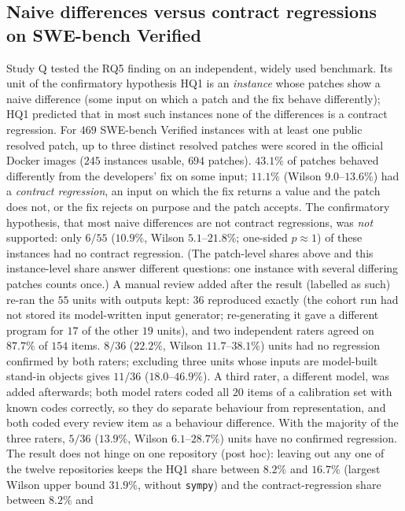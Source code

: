 \subsection{Naive differences versus contract regressions on SWE-bench Verified}
\label{sec:eval-swebench}
Study Q tested the RQ5 finding on an independent, widely used benchmark.  Its unit of the confirmatory hypothesis HQ1 is an
\emph{instance} whose patches show a naive difference (some input on which a patch and the fix behave differently); HQ1 predicted
that in most such instances none of the differences is a contract regression.  For $469$ SWE-bench Verified instances with at least one
public resolved patch, up to three distinct resolved patches were scored in the official Docker images ($245$ instances usable,
$694$ patches).  $43.1\%$ of patches behaved differently from the developers' fix on some input; $11.1\%$ (Wilson $9.0$--$13.6\%$)
had a \emph{contract regression}, an input on which the fix returns a value and the patch does not, or the fix rejects on purpose
and the patch accepts.  The confirmatory hypothesis, that most naive differences are not contract regressions, was \emph{not}
supported: only $6/55$ ($10.9\%$, Wilson $5.1$--$21.8\%$; one-sided $p\approx1$) of these instances had no contract regression.  (The
patch-level shares above and this instance-level share answer different questions: one instance with several differing patches
counts once.)
A manual review added after the result (labelled as such) re-ran the $55$ units with outputs kept: $36$ reproduced exactly (the cohort run had not stored its model-written input generator;
re-generating it gave a different program for $17$ of the other $19$ units), and two
independent raters agreed on $87.7\%$ of $154$ items.  $8/36$ ($22.2\%$, Wilson $11.7$--$38.1\%$) units had no regression confirmed by
both raters; excluding three units whose inputs are model-built stand-in objects gives $11/36$ ($18.0$--$46.9\%$).  A third rater, a different model, was added afterwards; both model raters coded all $20$ items of a calibration set with known
codes correctly, so they do separate behaviour from representation, and both coded every review item as a behaviour difference.
With the majority of the three raters, $5/36$ ($13.9\%$, Wilson $6.1$--$28.7\%$) units have no confirmed regression.  The result does not hinge on one repository (post hoc): leaving out any one of the twelve repositories keeps the HQ1 share between
$8.2\%$ and $16.7\%$ (largest Wilson upper bound $31.9\%$, without \texttt{sympy}) and the contract-regression share between $8.2\%$ and
